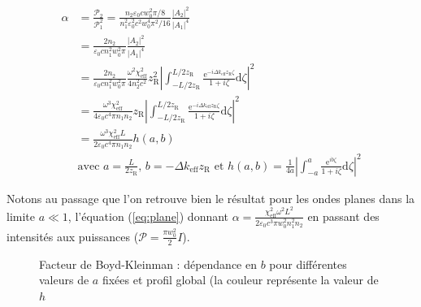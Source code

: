 \documentclass[11pt,a4paper] { article}
\newcommand{\zr}{z_\mathsc{R}}
\newcommand{\chie}{\chi_\mathsc{eff}}
\renewcommand{\P}{\mathscr{P}}
\newcommand{\e}[1]{\text{e}^{#1}}
\newcommand{\mathsc}[1]{\mathrm{\scriptscriptstyle {#1}}}
\begin{document}
\begin{align*} 
	\alpha &= \frac{\P_2}{\P_1^2} = \frac{n_2 \varepsilon_0 c w_0^2 \pi/8}{n_1^2 \varepsilon_0^2 c^2 w_0^4 \pi^2/16} \frac{|A_2|^2}{|A_1|^4} \\
	&= \frac{2n_2}{\varepsilon_0 c n_1^2 w_0^2 \pi} \frac{|A_2|^2}{|A_1|^4} \\
	&= \frac{2n_2}{\varepsilon_0 c n_1^2 w_0^2 \pi} \frac{\omega^2\chi_\mathsc{eff}^2}{4 n_2^2 c^2} \zr^2 
	\left| \int_{-L/2\zr}^{L/2\zr} \frac{\e{-i\Delta k_\mathsc{eff} \zr \zeta}}{1+i\zeta} \mathrm d\zeta \right|^2\\
	&= \frac{\omega^3 \chie^2}{4 \varepsilon_0 c^4 \pi n_1 n_2} \zr 
	\left| \int_{-L/2\zr}^{L/2\zr} \frac{\e{-i\Delta k_\mathsc{eff} \zr \zeta}}{1+i\zeta} \mathrm d\zeta \right|^2\\
	&= \boxed{ \frac{\omega^3 \chie^2 L}{2 \varepsilon_0 c^4 \pi n_1 n_2} h(a,b) } \\
	&\text{avec } \boxed{ a=\frac{L}{2z_{\mathsc R}}\text{, } b=- \Delta k_\mathsc{eff} z_{\mathsc R}
	\text{ et } h(a,b)=\frac{1}{4a} \left|\int_{-a}^{a} \frac{\e{ib\zeta}}{1+i\zeta} \mathrm d\zeta \right|^2 }
\end{align*}


Notons au passage que l'on retrouve bien le résultat pour les ondes planes dans la limite $a\ll1$, l'équation (\ref{eq:plane}) donnant $\alpha = \frac{\chie^2 \omega^2 L^2}{2 \varepsilon_0 c^3 \pi w_0^2 n_1^2 n_2}$ en passant des intensités aux puissances ($\P = \frac{\pi w_0^2}{2} I$). 


\begin{figure}[htpb] 
\centering
\hspace*{-0.8cm}
\begin{subfigure}[b]{0.48\textwidth}
	\small
	
\end{subfigure}
\hspace{0.2cm}
\begin{subfigure}[b]{0.48\textwidth}
	\small
	
\end{subfigure}
\hspace{0.8cm}
\caption{Facteur de Boyd-Kleinman : \small dépendance en $b$ pour différentes valeurs de $a$ fixées et profil global (la couleur représente la valeur de $h$}
\label{fig:bk-factor}
\end{figure}
\end{document}
